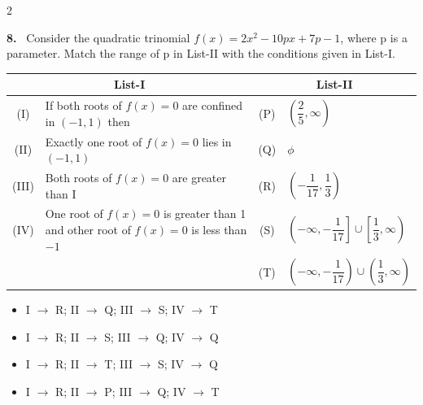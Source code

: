 \documentclass[10pt]{extarticle}
\newcommand{\qn}[1]{\par\smallskip\noindent\textbf{#1.}~}
\newenvironment{qoptions}{\begin{itemize}[leftmargin=1.8em,itemsep=1pt,topsep=2pt,label={}]}{\end{itemize}}
\newcommand{\opt}[2]{\item[(#1)] #2}
\begin{document}
\begin{multicols}{2}
\qn{8} Consider the quadratic trinomial $f(x)=2x^2-10px+7p-1$, where p is a parameter. Match the range of p in List-II with the conditions given in List-I.\par\nobreak
\begin{center}\small\setlength{\tabcolsep}{3pt}
\begin{tabular}{|c|p{3.6cm}|c|p{2.3cm}|}
\hline
\multicolumn{2}{|c|}{\textbf{List-I}} & \multicolumn{2}{c|}{\textbf{List-II}} \\
\hline
(I) & If both roots of $f(x)=0$ are confined in $(-1,1)$ then & (P) & $\left(\dfrac25,\infty\right)$ \\
\hline
(II) & Exactly one root of $f(x)=0$ lies in $(-1,1)$ & (Q) & $\phi$ \\
\hline
(III) & Both roots of $f(x)=0$ are greater than I & (R) & $\left(-\dfrac1{17},\dfrac13\right)$ \\
\hline
(IV) & One root of $f(x)=0$ is greater than 1 and other root of $f(x)=0$ is less than $-1$ & (S) & $\left(-\infty,-\dfrac1{17}\right]\cup\left[\dfrac13,\infty\right)$ \\
\hline
 & & (T) & $\left(-\infty,-\dfrac1{17}\right)\cup\left(\dfrac13,\infty\right)$ \\
\hline
\end{tabular}
\end{center}
\begin{qoptions}
\opt{A}{I $\to$ R; II $\to$ Q; III $\to$ S; IV $\to$ T}
\opt{B}{I $\to$ R; II $\to$ S; III $\to$ Q; IV $\to$ Q}
\opt{C}{I $\to$ R; II $\to$ T; III $\to$ S; IV $\to$ Q}
\opt{D}{I $\to$ R; II $\to$ P; III $\to$ Q; IV $\to$ T}
\end{qoptions}


\end{multicols}
\end{document}
